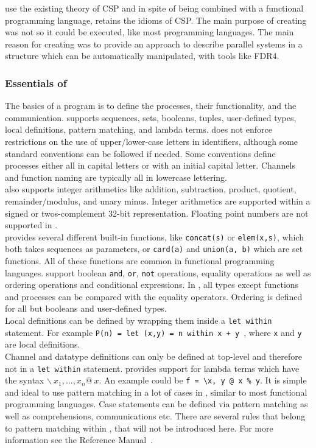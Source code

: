 \cspm{} use the existing theory of CSP and in spite of being combined with a functional programming language, \cspm{} retains the idioms of CSP.
The main purpose of creating \cspm{} was not so it could be executed, like most programming languages. The main reason for creating \cspm{} was to provide an approach to describe parallel systems in a structure which can be automatically manipulated, with tools like FDR4.
\subsubsection{Essentials of \cspm}
The basics of a \cspm{} program is to define the processes, their functionality, and the communication. \cspm{} supports sequences, sets, booleans, tuples, user-defined types, local definitions, pattern matching, and lambda terms.
\cspm{} does not enforce restrictions on the use of upper/lower-case letters in identifiers, although some standard conventions can be followed if needed. Some conventions define processes either all in capital letters or with an initial capital letter. Channels and function naming are typically all in lowercase lettering.\\

\cspm{} also supports integer arithmetics like addition, subtraction, product, quotient, remainder/modulus, and unary minus. Integer arithmetics are supported within a signed or twos-complement 32-bit representation.
Floating point numbers are not supported in \cspm. \\

\cspm{} provides several different built-in functions, like \texttt{concat(s)} or \texttt{elem(x,s)}, which both takes sequences as parameters, or \texttt{card(a)} and \texttt{union(a, b)} which are set functions. All of these functions are common in functional programming languages. \cspm{} support boolean \texttt{and}, \texttt{or}, \texttt{not} operations, equality operations as well as ordering operations and conditional expressions. In \cspm, all types except functions and processes can be compared with the equality operators. Ordering is defined for all but booleans and user-defined types. \\

Local definitions can be defined by wrapping them inside a \texttt{let within} statement. For example \texttt{P(n) = let (x,y) = n within x + y }, where \texttt{x} and \texttt{y} are local definitions.\\ Channel and datatype definitions can only be defined at top-level and therefore not in a \texttt{let within} statement.
\cspm{} provides support for lambda terms which have the syntax $\backslash \  x_1,...,x_n @\ x$. An example could be \texttt{f = \textbackslash x, y @ x \% y}.
It is simple and ideal to use pattern matching in a lot of cases in \cspm, similar to most functional programming languages. Case statements can be defined via pattern matching as well as comprehensions, communications etc. There are several rules that belong to pattern matching within \cspm{}, that will not be introduced here. For more information see the \cspm{} Reference Manual~\cite{Scattergood2011}.\\

